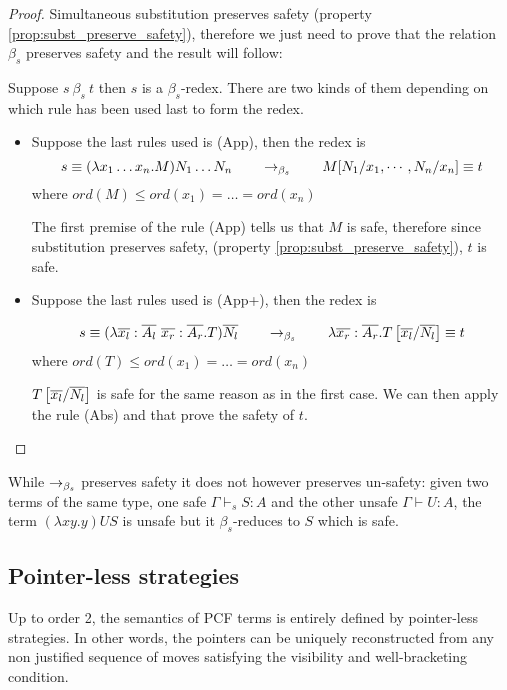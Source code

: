 \begin{proof}
Simultaneous substitution preserves safety (property
\ref{prop:subst_preserve_safety}), therefore we just need to prove
that the relation $\beta_s$ preserves safety and the result will
follow:

 Suppose $s\ \beta_s\ t$ then $s$ is a $\beta_s$-redex. There are two kinds of them
 depending on which rule has been used last to form the redex.

\begin{itemize}
\item Suppose the last rules used is (App), then the redex is
$$s \equiv (\lambda x_1 \ldots x_n . M) N_1 \ldots N_n \qquad \rightarrow_{\beta_s} \qquad M[N_1 / x_1 , \cdots, N_n / x_n] \equiv t$$
where $ord(M) \leq ord(x_1) = \ldots = ord(x_n)$

The first premise of the rule (App) tells us that $M$ is safe,
therefore since substitution preserves safety, (property
\ref{prop:subst_preserve_safety}), $t$ is safe.

\item Suppose the last rules used is (App+), then the redex is

 $$
s \equiv  (\lambda \overline{x_l} : \overline{A_l} \
\overline{x_r}: \overline{A_r} . T) \overline{N_l} \qquad \rightarrow_{\beta_s}
\qquad \lambda \overline{x_r}: \overline{A_r} .
T\left[ \overline{x_l}/\overline{N_l} \right] \equiv  t
$$
where $ord(T) \leq ord(x_1) = \ldots = ord(x_n)$

$T\left[ \overline{x_l}/\overline{N_l} \right]$ is safe for the same
reason as in the first case. We can then apply the rule (Abs) and
that prove the safety of $t$.
\end{itemize}
\end{proof}



\begin{rem}
\label{rem:betasred_notpreserv_unsafety} While $\rightarrow_{\beta_s}$ preserves
safety it does not however preserves un-safety: given two terms of
the same type, one safe $\Gamma \vdash_s S : A$ and the other unsafe
$\Gamma \vdash U : A$, the term $(\lambda x y . y) U S$ is unsafe
but it $\beta_s$-reduces to $S$ which is safe.
\end{rem}

\subsection{Pointer-less strategies}
\label{subsec:ptrless_strat}

Up to order 2, the semantics of PCF terms is entirely defined by
pointer-less strategies. In other words, the pointers can be
uniquely reconstructed from any non justified sequence of moves
satisfying the visibility and well-bracketing condition.

